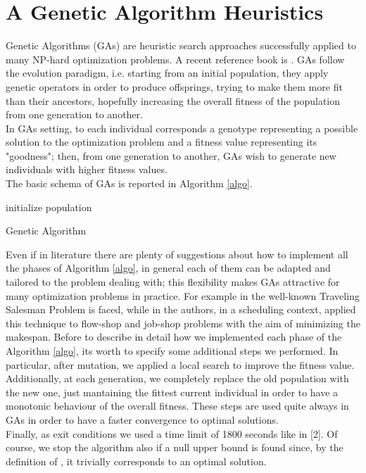 \documentclass[opre,nonblindrev]{informs3} %
\begin{document}
\section{A Genetic Algorithm Heuristics}
Genetic Algorithms (GAs) are heuristic search approaches successfully applied to many NP-hard optimization problems. A recent reference book is \cite{kramer}. GAs follow the evolution paradigm, i.e. starting from an initial population, they apply genetic operators in order to produce offsprings, trying to make them more fit than their ancestors, hopefully increasing the overall fitness of the population from one generation to another.\\
In GAs setting, to each individual corresponds a genotype representing a possible solution to the optimization problem and a fitness value representing its "goodness"; then, from one generation to another, GAs wish to generate new individuals with higher fitness values.\\
The	basic schema of GAs is reported in Algorithm \ref{algo}.\\
\begin{algorithm} \label{algo}
	\SetAlgoLined
	initialize population\\
	\caption{Genetic Algorithm}
\end{algorithm}
\noindent Even if in literature there are plenty of suggestions about how to implement all the phases of Algorithm \ref{algo}, in general each of them can be adapted and tailored to the problem dealing with; this flexibility makes GAs attractive for many optimization problems in practice. For example in \cite{tsp1,tsp2,tsp3} the well-known Traveling Salesman Problem is faced, while in \cite{sched1,sched3} the authors, in a scheduling context, applied this technique to flow-shop and job-shop problems with the aim of minimizing the makespan.
Before to describe in detail how we implemented each phase of the Algorithm \ref{algo}, its worth to specify some additional steps we performed. In particular, after mutation, we applied a local search to improve the fitness value. Additionally, at each generation, we completely replace the old population with the new one, just mantaining the fittest current individual in order to have a monotonic behaviour of the overall fitness. These steps are used quite always in GAs in order to have a faster convergence to optimal solutions.\\
Finally, as exit conditions we used a time limit of 1800 seconds like in [2]. Of course, we stop the algorithm also if a null upper bound is found since, by the definition of , it trivially corresponds to an optimal solution. 
\end{document}
